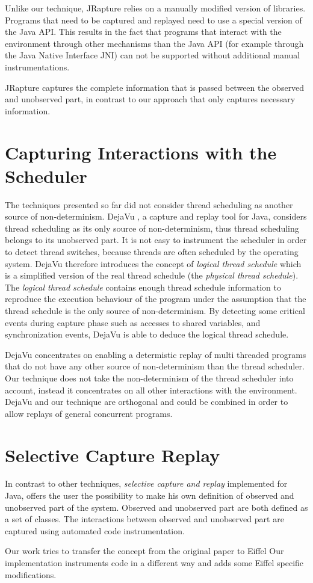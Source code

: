 Unlike our technique, JRapture relies on a manually modified version of libraries. Programs that need to be captured and replayed need to use a special version of the Java API.  This results in the fact that programs that interact with the environment through other mechanisms than the Java API (for example through the Java Native Interface JNI) can not be supported without additional manual instrumentations.

JRapture captures the complete information that is passed between the observed and unobserved part, in contrast to our approach that only captures necessary information.

\section {Capturing Interactions with the Scheduler}
The techniques presented so far did not consider thread scheduling as another source of non-determinism. DejaVu \cite{dejavu}, a capture and replay tool for Java, considers thread scheduling as its only source of non-determinism, thus thread scheduling belongs to its unobserved part. It is not easy to instrument the scheduler in order to detect thread switches, because threads are often scheduled by the operating system. DejaVu therefore introduces the concept of \emph{logical thread schedule} which is a simplified version of the real thread schedule (the \emph{physical thread schedule}). The \emph{logical thread schedule} contains enough thread schedule information to reproduce the execution behaviour of the program under the assumption that the thread schedule is the only source of non-determinism. By detecting some critical events during capture phase such as accesses to shared variables, and synchronization events, DejaVu is able to deduce the logical thread schedule.

DejaVu concentrates on enabling a determistic replay of multi threaded programs that do not have any other source of non-determinism than the thread scheduler. Our technique does not take the non-determinism of the thread scheduler into account, instead it concentrates on all other interactions with the environment. DejaVu and 
our technique are orthogonal and could be combined in order to allow replays of general concurrent programs. 

\section{Selective Capture Replay}
In contrast to other techniques, \emph{selective capture and replay} \cite{orso05may} implemented for Java, offers the user the possibility to make his own definition of observed and unobserved part of the system.
Observed and unobserved part are both defined as a set of classes. The interactions between observed and unobserved part are captured using automated code instrumentation.


Our work tries to transfer the concept from the original paper \cite{orso05may} to Eiffel Our implementation instruments code in a different way and adds some Eiffel specific modifications.

